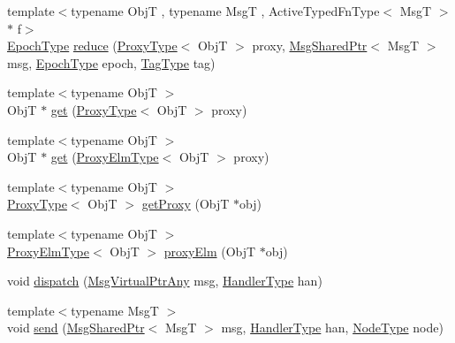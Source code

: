 \begin{DoxyCompactItemize}
\item 
{\footnotesize template$<$typename ObjT , typename MsgT , Active\+Typed\+Fn\+Type$<$ Msg\+T $>$ $\ast$ f$>$ }\\\hyperlink{namespacevt_a985a5adf291c34a3ca263b3378388236}{Epoch\+Type} \hyperlink{structvt_1_1objgroup_1_1_obj_group_manager_a05ba08683c807830bc80445cdd864152}{reduce} (\hyperlink{structvt_1_1objgroup_1_1_obj_group_manager_aea65eef52f240a52210132eef5ce591f}{Proxy\+Type}$<$ ObjT $>$ proxy, \hyperlink{namespacevt_ab2b3d506ec8e8d1540aede826d84a239}{Msg\+Shared\+Ptr}$<$ MsgT $>$ msg, \hyperlink{namespacevt_a985a5adf291c34a3ca263b3378388236}{Epoch\+Type} epoch, \hyperlink{namespacevt_a84ab281dae04a52a4b243d6bf62d0e52}{Tag\+Type} tag)
\item 
{\footnotesize template$<$typename ObjT $>$ }\\ObjT $\ast$ \hyperlink{structvt_1_1objgroup_1_1_obj_group_manager_a4b11402fc31ca40e1dd2eacb65101e2b}{get} (\hyperlink{structvt_1_1objgroup_1_1_obj_group_manager_aea65eef52f240a52210132eef5ce591f}{Proxy\+Type}$<$ ObjT $>$ proxy)
\item 
{\footnotesize template$<$typename ObjT $>$ }\\ObjT $\ast$ \hyperlink{structvt_1_1objgroup_1_1_obj_group_manager_a70e5e1d0ada31d6f88a8ec88965df895}{get} (\hyperlink{structvt_1_1objgroup_1_1_obj_group_manager_adba6c8ecb0f4c30e719f1abb995cfc9b}{Proxy\+Elm\+Type}$<$ ObjT $>$ proxy)
\item 
{\footnotesize template$<$typename ObjT $>$ }\\\hyperlink{structvt_1_1objgroup_1_1_obj_group_manager_aea65eef52f240a52210132eef5ce591f}{Proxy\+Type}$<$ ObjT $>$ \hyperlink{structvt_1_1objgroup_1_1_obj_group_manager_a9758d68a4656e7ff2eb1ac07b4feeeed}{get\+Proxy} (ObjT $\ast$obj)
\item 
{\footnotesize template$<$typename ObjT $>$ }\\\hyperlink{structvt_1_1objgroup_1_1_obj_group_manager_adba6c8ecb0f4c30e719f1abb995cfc9b}{Proxy\+Elm\+Type}$<$ ObjT $>$ \hyperlink{structvt_1_1objgroup_1_1_obj_group_manager_a31f00bd509986001e3154af24239f24d}{proxy\+Elm} (ObjT $\ast$obj)
\item 
void \hyperlink{structvt_1_1objgroup_1_1_obj_group_manager_a65dffa67cfc975ca32a57c60677b2ae0}{dispatch} (\hyperlink{namespacevt_a54674b9f819f4f3a652c6f78d9b62aaf}{Msg\+Virtual\+Ptr\+Any} msg, \hyperlink{namespacevt_af64846b57dfcaf104da3ef6967917573}{Handler\+Type} han)
\item 
{\footnotesize template$<$typename MsgT $>$ }\\void \hyperlink{structvt_1_1objgroup_1_1_obj_group_manager_a58abda8b7d1372bea7ca061402e69c75}{send} (\hyperlink{namespacevt_ab2b3d506ec8e8d1540aede826d84a239}{Msg\+Shared\+Ptr}$<$ MsgT $>$ msg, \hyperlink{namespacevt_af64846b57dfcaf104da3ef6967917573}{Handler\+Type} han, \hyperlink{namespacevt_a866da9d0efc19c0a1ce79e9e492f47e2}{Node\+Type} node)

\end{DoxyCompactItemize}
